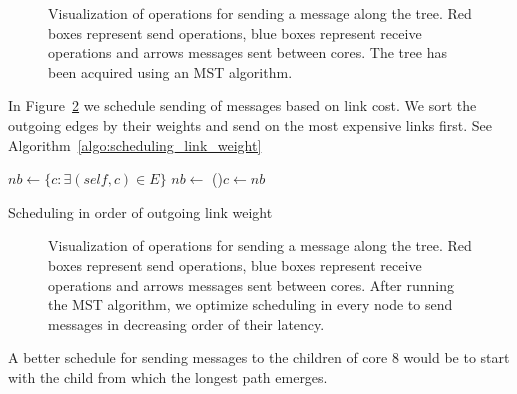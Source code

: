 \documentclass{article}
\begin{document}
\begin{figure}[htb]
  \centering
  \begin{tikzpicture}[scale=.35,transform shape]
    
  \end{tikzpicture}
  \caption{Visualization of operations for sending a message along the
    tree. Red boxes represent send operations, blue boxes represent
    receive operations and arrows messages sent between cores. The
    tree has been acquired using an MST algorithm.}
  \label{fig:mst_gruyere_operations}
\end{figure}

In Figure~\ref{fig:mst_gruyere_operations_sorted} we schedule sending
of messages based on link cost. We sort the outgoing edges by their
weights and send on the most expensive links first. See
Algorithm~\ref{algo:scheduling_link_weight}

\begin{algorithm}[htb]
%
%
%
  \BlankLine
  $nb \leftarrow \{ c: \exists (self, c) \in E \}$
  $nb \leftarrow $ 
  \For(){$c \leftarrow nb$}{
  }
  \caption{Scheduling in order of outgoing link weight}
  \label{algo:scheduling_link_weight}
\end{algorithm}

\begin{figure}[htb]
  \centering
  \begin{tikzpicture}[scale=.35,transform shape]
    
  \end{tikzpicture}
  \caption{Visualization of operations for sending a message along the
    tree. Red boxes represent send operations, blue boxes represent
    receive operations and arrows messages sent between cores. After
    running the MST algorithm, we optimize scheduling in every node to
    send messages in decreasing order of their latency.}
  \label{fig:mst_gruyere_operations_sorted}
\end{figure}

A better schedule for sending messages to the children of core 8 would
be to start with the child from which the longest path emerges.
\end{document}

